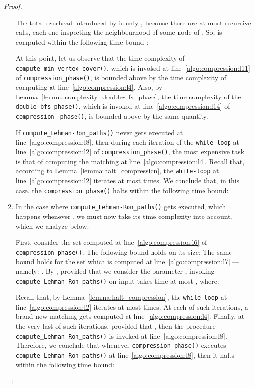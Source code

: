 \begin{proof}
\begin{enumerate}
The total overhead introduced by  is only ,
because there are at most  recursive calls, each one inspecting the neighbourhood of some node of .
So,  is computed within the following time bound :

At this point, let us observe that the time complexity of \texttt{compute\_min\_vertex\_cover()},
which is invoked at line~\ref{algo:compression:l11} of \texttt{compression\_phase()},
is bounded above by the time complexity of computing  at line~\ref{algo:compression:l4}.
Also, by Lemma~\ref{lemma:complexity_double-bfs_phase},
the time complexity of the \texttt{double-bfs\_phase()}, which is invoked at line~\ref{algo:compression:l14}
of \texttt{compression\_} \texttt{phase()}, is bounded above by the same quantity.


If \texttt{compute\_Lehman-Ron\_paths()} never gets executed at line~\ref{algo:compression:l8},
then during each iteration of the \texttt{while-loop}
at line~\ref{algo:compression:l2} of \texttt{compression\_phase()},
the most expensive task is that of computing the matching  at line~\ref{algo:compression:l4}.
Recall that, according to
Lemma~\ref{lemma:halt_compression}, the \texttt{while-loop}
at line~\ref{algo:compression:l2} iterates at most  times.
We conclude that, in this case, the \texttt{compression\_phase()} halts within the following time bound:


    \item In the case where  \texttt{compute\_Lehman-Ron\_paths()} gets executed,
    which happens whenever , we must now take its time complexity into account, which we analyze below.

First, consider the set  computed at line~\ref{algo:compression:l6} of \texttt{compression\_phase()}.
The following bound holds on its size: 
The same bound holds for the set  which is computed at line~\ref{algo:compression:l7} --- namely:
.
By , provided that we consider the parameter ,
invoking \texttt{compute\_Lehman-Ron\_paths()}
on input  takes time at most , where:


Recall that, by Lemma~\ref{lemma:halt_compression}, the \texttt{while-loop}
at line~\ref{algo:compression:l2} iterates at most  times.
At each of such iterations, a brand new matching  gets computed at line~\ref{algo:compression:l4}.
Finally, at the very last of such iterations, provided that , then the procedure
\texttt{compute\_Lehman-Ron\_paths()} is invoked at line~\ref{algo:compression:l8}.
Therefore, we conclude that whenever \texttt{compression\_phase()}
executes \texttt{compute\_Lehman-Ron\_paths()} at line~\ref{algo:compression:l8},
then it halts within the following time bound:

\end{enumerate}
\end{proof}

